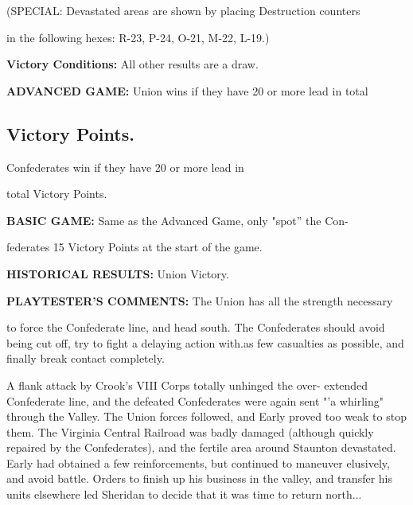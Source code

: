 \begin{scenariodata}
(SPECIAL: Devastated areas are shown by placing Destruction counters\\
\end{scenariodata}

in the following hexes: R-23, P-24, O-21, M-22, L-19.)

\begin{scenariodata}
\textbf{Victory Conditions:} All other results are a draw.\\
\end{scenariodata}

\begin{scenariodata}
\textbf{ADVANCED GAME:} Union wins if they have 20 or more lead in total\\
\end{scenariodata}

\subsection*{Victory Points.}

\begin{scenariodata}
Confederates win if they have 20 or more lead in\\
\end{scenariodata}

total Victory Points.

\begin{scenariodata}
\textbf{BASIC GAME:} Same as the Advanced Game, only "spot'' the Con-\\
\end{scenariodata}

federates 15 Victory Points at the start of the game.

\begin{scenariodata}
\textbf{HISTORICAL RESULTS:} Union Victory.\\
\end{scenariodata}

\begin{scenariodata}
\textbf{PLAYTESTER'S COMMENTS:} The Union has all the strength necessary\\
\end{scenariodata}

to force the Confederate line, and head south. The Confederates should avoid being cut off, try to fight a delaying action with.as few casualties as possible, and finally break contact completely.

A flank attack by Crook's VIII Corps totally unhinged the over- extended Confederate line, and the defeated Confederates were again sent "'a whirling" through the Valley. The Union forces followed, and Early proved too weak to stop them. The Virginia Central Railroad was badly damaged (although quickly repaired by the Confederates), and the fertile area around Staunton devastated. Early had obtained a few reinforcements, but continued to maneuver elusively, and avoid battle. Orders to finish up his business in the valley, and transfer his units elsewhere led Sheridan to decide that it was time to return north...

